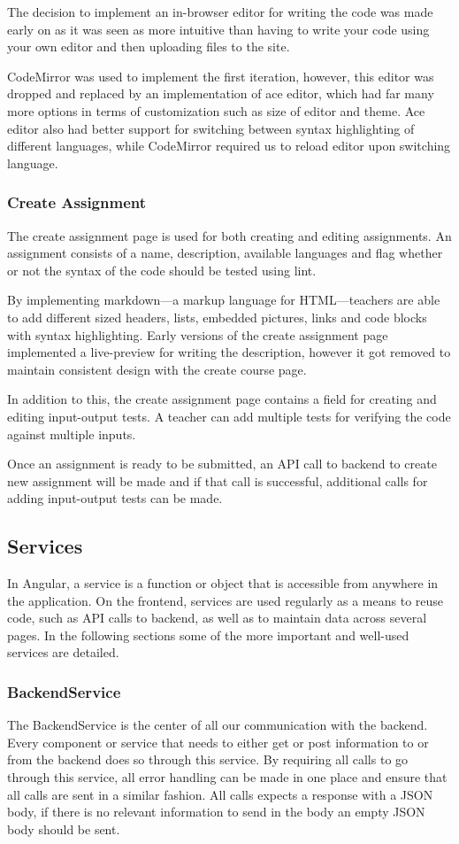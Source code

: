 The decision to implement an in-browser editor for writing the code was made early on as it was seen as more intuitive than having to write your code using your own editor and then uploading files to the site.

CodeMirror was used to implement the first iteration, however, this editor was dropped and replaced by an implementation of ace editor, which had far many more options in terms of customization such as size of editor and theme. Ace editor also had better support for switching between syntax highlighting of different languages, while CodeMirror required us to reload editor upon switching language. 

\subsubsection{Create Assignment}
The create assignment page is used for both creating and editing assignments. An assignment consists of a name, description, available languages and flag whether or not the syntax of the code should be tested using lint. 

By implementing markdown---a markup language for HTML---teachers are able to add different sized headers, lists, embedded pictures, links and code blocks with syntax highlighting. Early versions of the create assignment page implemented a live-preview for writing the description, however it got removed to maintain consistent design with the create course page. 

In addition to this, the create assignment page contains a field for creating and editing input-output tests. A teacher can add multiple tests for verifying the code against multiple inputs.

Once an assignment is ready to be submitted, an API call to backend to create new assignment will be made and if that call is successful, additional calls for adding input-output tests can be made. 

\subsection{Services}
In Angular, a service is a function or object that is accessible from anywhere in the application. On the frontend, services are used regularly as a means to reuse code, such as API calls to backend, as well as to maintain data across several pages. In the following sections some of the more important and well-used services are detailed.

\subsubsection{BackendService}
The BackendService is the center of all our communication with the backend. Every component or service that needs to either get or post information to or from the backend does so through this service. By requiring all calls to go through this service, all error handling can be made in one place and ensure that all calls are sent in a similar fashion. All calls expects a response with a JSON body, if there is no relevant information to send in the body an empty JSON body should be sent.


